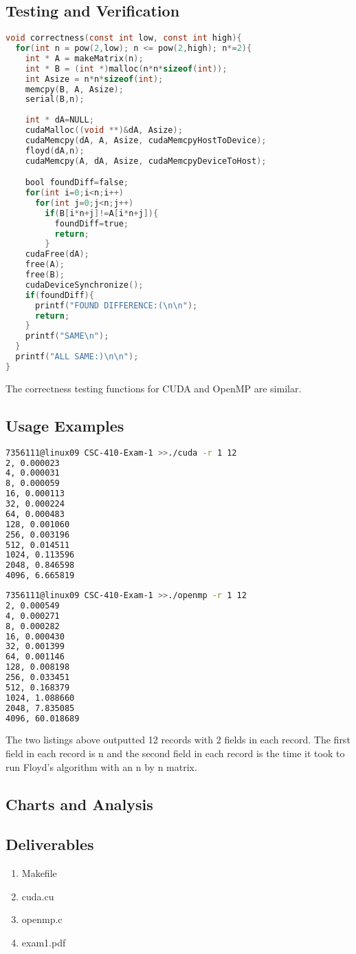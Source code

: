 \documentclass[12pt]{article}
\begin{document}
\subsection*{Testing and Verification}
\begin{lstlisting}[frame=single,language=C,caption=CUDA Correctness Testing \label{code:make}]
void correctness(const int low, const int high){
  for(int n = pow(2,low); n <= pow(2,high); n*=2){
    int * A = makeMatrix(n);
    int * B = (int *)malloc(n*n*sizeof(int));
    int Asize = n*n*sizeof(int);
    memcpy(B, A, Asize);
    serial(B,n);
    
    int * dA=NULL;
    cudaMalloc((void **)&dA, Asize);
    cudaMemcpy(dA, A, Asize, cudaMemcpyHostToDevice);
    floyd(dA,n);
    cudaMemcpy(A, dA, Asize, cudaMemcpyDeviceToHost);

    bool foundDiff=false;
    for(int i=0;i<n;i++)
      for(int j=0;j<n;j++)
        if(B[i*n+j]!=A[i*n+j]){
          foundDiff=true;
          return;
        }
    cudaFree(dA);
    free(A);
    free(B);
    cudaDeviceSynchronize();
    if(foundDiff){
      printf("FOUND DIFFERENCE:(\n\n");
      return;
    }
    printf("SAME\n");
  }
  printf("ALL SAME:)\n\n");
}
\end{lstlisting}
The correctness testing functions for CUDA and OpenMP are similar. 

\newpage
\subsection*{Usage Examples}
\begin{lstlisting}[frame=single,language=Bash,caption=CUDA Range Option \label{code:make}]
7356111@linux09 CSC-410-Exam-1 >>./cuda -r 1 12
2, 0.000023
4, 0.000031
8, 0.000059
16, 0.000113
32, 0.000224
64, 0.000483
128, 0.001060
256, 0.003196
512, 0.014511
1024, 0.113596
2048, 0.846598
4096, 6.665819
\end{lstlisting}
\begin{lstlisting}[frame=single,language=Bash,caption=OpenMP Range Option \label{code:make}]
7356111@linux09 CSC-410-Exam-1 >>./openmp -r 1 12
2, 0.000549
4, 0.000271
8, 0.000282
16, 0.000430
32, 0.001399
64, 0.001146
128, 0.008198
256, 0.033451
512, 0.168379
1024, 1.088660
2048, 7.835085
4096, 60.018689
\end{lstlisting}
The two listings above outputted 12 records with 2 fields in each record. The first field in each record is n and the second field in each record is the time it took to run Floyd's algorithm with an n by n matrix.



\subsection*{Charts and Analysis}

\subsection*{Deliverables}
\begin{enumerate}
	\item Makefile
	\item cuda.cu
	\item openmp.c
	\item exam1.pdf
\end{enumerate}
\end{document}
